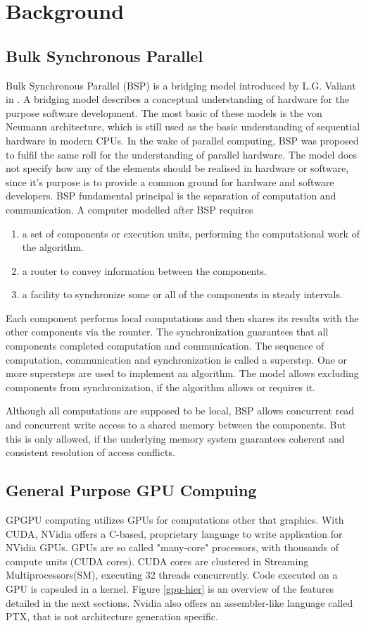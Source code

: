 \chapter{Background}
\section{Bulk Synchronous Parallel} \label{sec:bsp}
Bulk Synchronous Parallel (BSP) is a bridging model introduced by L.G. Valiant in \cite{Valiant:1990:BMP:79173.79181}. A bridging model describes a conceptual understanding of
hardware for the purpose software development. The most basic of these models is the von Neumann architecture, which is still used as the basic understanding of sequential hardware in modern CPUs. In the wake of parallel computing, BSP was proposed to fulfil the same roll
for the understanding of parallel hardware. The model does not specify how any of the elements should be realised in hardware or software, since it's purpose is to provide a common ground for hardware and software developers. 
BSP fundamental principal is the separation of computation and communication. A computer modelled after BSP requires
\begin{enumerate}
	\item a set of components or execution units, performing the computational work of the algorithm.
	\item a router to convey information between the components.
	\item a facility to synchronize some or all of the components in steady intervals.
\end{enumerate}
Each component performs local computations and then shares its results with
the other components via the rounter. The synchronization guarantees that all components completed computation and communication. The sequence of computation, communication and synchronization is called a superstep. One or more supersteps are used to implement an algorithm.
The model allows excluding components from synchronization, if the algorithm allows or requires it.

Although all computations are supposed to be local, BSP allows concurrent read and concurrent write access to a shared memory between the
components. But this is only allowed, if the underlying memory system guarantees coherent and consistent resolution of access conflicts.

\section{General Purpose GPU Compuing}
GPGPU computing utilizes GPUs for computations other that graphics. With CUDA, NVidia offers a C-based, proprietary language to write application for NVidia GPUs. GPUs are so called "many-core" processors, with thousands of compute units (CUDA cores). CUDA cores are clustered in Streaming Multiprocessors(SM), executing 32 threads concurrently. Code executed on a GPU is capsuled in a kernel. Figure \ref{gpu-hier} is an overview of the features detailed in the next sections. Nvidia also offers an assembler-like language called PTX, that is not architecture generation specific. \cite[4.1-4.2	]{cuda-man}

